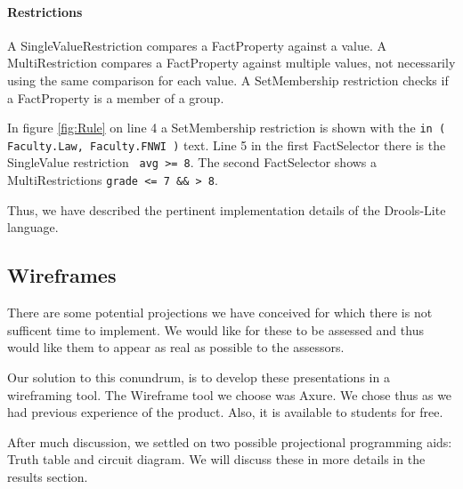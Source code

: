 \paragraph{Restrictions}
A SingleValueRestriction compares a FactProperty against a value.
A MultiRestriction compares a FactProperty against multiple values, not necessarily using the same comparison for each value.
A SetMembership restriction checks if a FactProperty is a member of a group.

In figure \ref{fig:Rule} on line 4 a SetMembership restriction is shown with the \texttt{in ( Faculty.Law, Faculty.FNWI )} text.
Line 5 in the first FactSelector there is the SingleValue restriction \texttt{ avg >= 8}.
The second FactSelector shows a MultiRestrictions \texttt{grade <= 7 \&\& > 8}.

Thus, we have described the pertinent implementation details of the Drools-Lite language.

\subsection{Wireframes}

There are some potential projections we have conceived for which there is not sufficent time to implement.
We would like for these to be assessed and thus would like them to appear as real as possible to the assessors.

Our solution to this conundrum, is to develop these presentations in a wireframing tool.
The Wireframe tool we choose was Axure\cite{Axure_ProductPage}.
We chose thus as we had previous experience of the product.
Also, it is available to students for free.

After much discussion, we settled on two possible projectional programming aids: Truth table and circuit diagram.
We will discuss these in more details in the results section.

